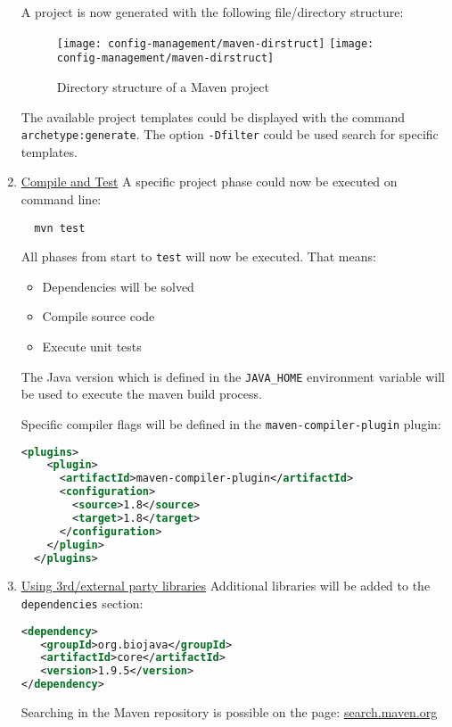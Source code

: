 \begin{enumerate}
A project is now generated with the following file/directory structure:
\begin{figure}[H]
  \centering
\ifslides
  \texttt{[image: config-management/maven-dirstruct]}
\else
  \texttt{[image: config-management/maven-dirstruct]}
\fi
  \caption{Directory structure of a Maven project}
  \label{fig:maven-dirstruct}
\end{figure}
\newslide
The available project templates could be displayed with the command
\verb|archetype:generate|. The option \verb|-Dfilter| could be used search
for specific templates.
%
\newslide
\item \underline{Compile and Test}
A specific project phase could now be executed on command line:
\begin{lstlisting}
  mvn test
\end{lstlisting}
All phases from start to \verb|test| will now be executed. That means:
\begin{itemize}
\item Dependencies will be solved
\item Compile source code
\item Execute unit tests
\end{itemize}

The Java version which is defined in the \verb|JAVA_HOME| environment
variable will be used to execute the maven build process.

\vspace{3mm}

Specific compiler flags will be defined in the \verb+maven-compiler-plugin+ plugin:
\begin{lstlisting}[language=xml,
  morekeywords={plugins,plugin,configuration,artifactId,source,target}]
  <plugins>
    <plugin>
      <artifactId>maven-compiler-plugin</artifactId>
      <configuration>
        <source>1.8</source>
        <target>1.8</target>
      </configuration>
    </plugin>
  </plugins>
\end{lstlisting}

\item \underline{Using 3rd/external party libraries}
Additional libraries will be added to the \verb|dependencies| section:
\begin{lstlisting}[language=xml,
    morekeywords={dependency,groupId,artifactId,version,scope}]
<dependency>
   <groupId>org.biojava</groupId>
   <artifactId>core</artifactId>
   <version>1.9.5</version>
</dependency>
\end{lstlisting}
Searching in the Maven repository is possible on the page:
\href{https://search.maven.org}{search.maven.org}


\end{enumerate}
